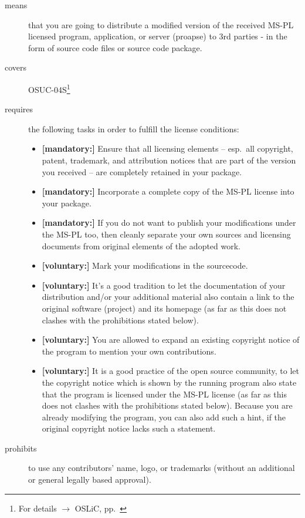 \begin{description}

\item[means] that you are going to distribute a modified version of the received
MS-PL licensed program, application, or server (proapse) to 3rd parties - in
the form of source code files or source code package.

\item[covers] OSUC-04S\footnote{For details $\rightarrow$ OSLiC, pp.\
\pageref{OSUC-04S-DEF}}

\item[requires] the following tasks in order to fulfill the license conditions:
\begin{itemize}
  \item \textbf{[mandatory:]} Ensure that all licensing elements -- esp.\ all
  copyright, patent, trademark, and attribution notices that are part of the
  version you received -- are completely retained in your package.
 
  \item \textbf{[mandatory:]} Incorporate a complete copy of the MS-PL license
  into your package.
  
  \item \textbf{[mandatory:]} If you do not want to publish your modifications
  under the MS-PL too, then cleanly separate your own sources and licensing
  documents from original elements of the adopted work.
  
  \item \textbf{[voluntary:]} Mark your modifications in the sourcecode.
  
  \item \textbf{[voluntary:]} It's a good tradition to let the documentation of
  your distribution and/or your additional material also contain a link to the
  original software (project) and its homepage (as far as this does not clashes
  with the prohibitions stated below).
  
  \item \textbf{[voluntary:]} You are allowed to expand an existing copyright
  notice of the program to mention your own contributions.
  
  \item \textbf{[voluntary:]} It is a good practice of the open source
  community, to let the copyright notice which is shown by the running program
  also state that the program is licensed under the MS-PL license (as far as
  this does not clashes with the prohibitions stated below). Because you are
  already modifying the program, you can also add such a hint, if the 
  original copyright notice lacks such a statement.
    
\end{itemize}

\item[prohibits] to use any contributors' name, logo, or trademarks (without an
additional or general legally based approval).

\end{description}


